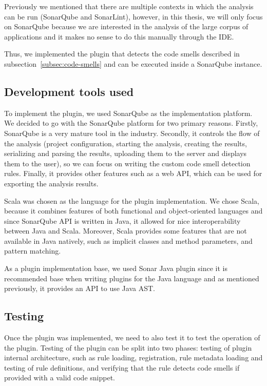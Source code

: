 Previously we mentioned that there are multiple contexts in which the analysis can be run (SonarQube and SonarLint),
however, in this thesis, we will only focus on SonarQube because we are interested in the analysis of the large corpus
of applications and it makes no sense to do this manually through the IDE\@.

Thus, we implemented the plugin that detects the code smells described in subsection~\ref{subsec:code-smells} and
can be executed inside a SonarQube instance.

\subsection{Development tools used}\label{subsec:development-tools-used}

To implement the plugin, we used SonarQube as the implementation platform.
We decided to go with the SonarQube platform for two primary reasons.
Firstly, SonarQube is a very mature tool in the industry.
Secondly, it controls the flow of the analysis (project configuration, starting
the analysis, creating the results, serializing and parsing the results, uploading them
to the server and displays them to the user), so we can focus on writing the custom code smell
detection rules.
Finally, it provides other features such as a web API, which can be used for exporting the analysis results.

Scala was chosen as the language for the plugin implementation.
We chose Scala, because it combines features of both functional and object-oriented languages and since SonarQube
API is written in Java, it allowed for nice interoperability between Java and Scala.
Moreover, Scala provides some features that are not available in Java natively, such as implicit classes and
method parameters, and pattern matching.

As a plugin implementation base, we used Sonar Java plugin since it is recommended
base when writing plugins for the Java language and as mentioned previously, it provides
an API to use Java AST\@.

\subsection{Testing}\label{subsec:testing}

Once the plugin was implemented, we need to also test it to test the operation of the plugin.
Testing of the plugin can be split into two phases: testing of plugin internal architecture, such as
rule loading, registration, rule metadata loading and testing of rule definitions, and verifying that
the rule detects code smells if provided with a valid code snippet.

